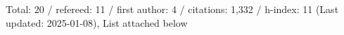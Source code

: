 Total: 20 / refereed: 11 / first author: 4 / citations: 1,332 / h-index: 11 (Last updated: 2025-01-08), List attached below